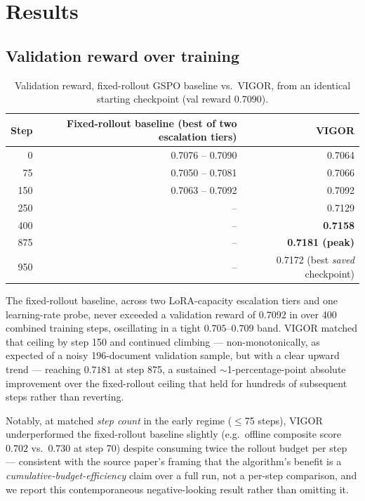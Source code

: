 \documentclass[11pt]{article}
\begin{document}
\section{Results}
\label{sec:results}

\subsection{Validation reward over training}

\begin{table}[h]
\centering
\caption{Validation reward, fixed-rollout GSPO baseline vs.\ VIGOR, from an
identical starting checkpoint (val reward $0.7090$).}
\label{tab:val-trend}
\begin{tabular}{@{}rrr@{}}
\toprule
Step & Fixed-rollout baseline (best of two escalation tiers) & VIGOR \\
\midrule
0    & 0.7076 -- 0.7090 & 0.7064 \\
75   & 0.7050 -- 0.7081 & 0.7066 \\
150  & 0.7063 -- 0.7092 & 0.7092 \\
250  & --                & 0.7129 \\
400  & --                & \textbf{0.7158} \\
875  & --                & \textbf{0.7181 (peak)} \\
950  & --                & 0.7172 (best \emph{saved} checkpoint) \\
\bottomrule
\end{tabular}
\end{table}

The fixed-rollout baseline, across two LoRA-capacity escalation tiers and one
learning-rate probe, never exceeded a validation reward of $0.7092$ in over 400
combined training steps, oscillating in a tight $0.705$--$0.709$ band. VIGOR
matched that ceiling by step 150 and continued climbing — non-monotonically, as
expected of a noisy 196-document validation sample, but with a clear upward trend
— reaching $0.7181$ at step 875, a sustained $\sim$1-percentage-point absolute
improvement over the fixed-rollout ceiling that held for hundreds of subsequent
steps rather than reverting.

Notably, at matched \emph{step count} in the early regime ($\le$75 steps), VIGOR
underperformed the fixed-rollout baseline slightly (e.g.\ offline composite score
$0.702$ vs.\ $0.730$ at step 70) despite consuming twice the rollout budget per
step — consistent with the source paper's framing that the algorithm's benefit is
a \emph{cumulative-budget-efficiency} claim over a full run, not a per-step
comparison, and we report this contemporaneous negative-looking result rather than
omitting it.
\end{document}
